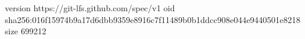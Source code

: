 version https://git-lfs.github.com/spec/v1
oid sha256:016f15974b9a17d6dbb9359e8916c7f11489b0b1ddcc908e044e9440501e8218
size 699212
